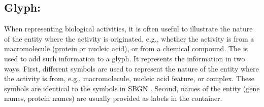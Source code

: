 \subsection{Glyph: }
\label{sec:af:unitInfo}

When representing biological activities, it is often useful to illustrate the nature of the entity where the activity is originated, e.g., whether the activity is from a macromolecule (protein or nucleic acid), or from a chemical compound.  The \SBGNAFLone {} is used to add such information to a glyph.  It represents the information in two ways.  First, different symbols are used to represent the nature of the entity where the activity is from, e.g., macromolecule, nucleic acid feature, or complex.  These symbols are identical to the  symbols in SBGN \PDl.  Second, names of the entity (gene names, protein names) are usually provided as labels in the  container.

